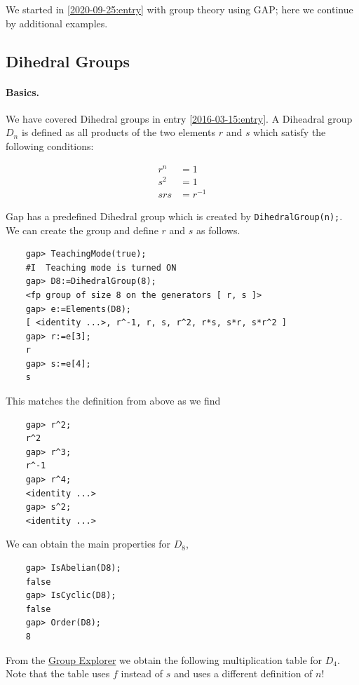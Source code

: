 
We started in \ref{2020-09-25:entry} with group theory using GAP; here we continue by additional examples.

\subsection{Dihedral Groups}

\paragraph{Basics.} We have covered Dihedral groups in entry \ref{2016-03-15:entry}. A Diheadral group $D_n$ is defined as all products of the two elements $r$ and $s$ which satisfy the following conditions:

\begin{align*}
r^n &= 1 \\
s^2 &= 1 \\
srs &= r^{-1}
\end{align*}

Gap has a predefined Dihedral group which is created by \verb+DihedralGroup(n);+. We can create the group and define $r$ and $s$ as follows.

\begin{verbatim}
    gap> TeachingMode(true);
    #I  Teaching mode is turned ON
    gap> D8:=DihedralGroup(8);
    <fp group of size 8 on the generators [ r, s ]>
    gap> e:=Elements(D8);
    [ <identity ...>, r^-1, r, s, r^2, r*s, s*r, s*r^2 ]
    gap> r:=e[3];
    r
    gap> s:=e[4];
    s
\end{verbatim}

This matches the definition from above as we find

\begin{verbatim}
    gap> r^2;
    r^2
    gap> r^3;
    r^-1
    gap> r^4;
    <identity ...>
    gap> s^2;
    <identity ...>
\end{verbatim}

We can obtain the main properties for $D_8$,

\begin{verbatim}
    gap> IsAbelian(D8);
    false
    gap> IsCyclic(D8);
    false
    gap> Order(D8);
    8
\end{verbatim}

From the \href{https://nathancarter.github.io/group-explorer/Multtable.html?groupURL=https://nathancarter.github.io/group-explorer/groups/D_4.group}{Group Explorer} we obtain the following multiplication table for $D_4$. Note that the table uses $f$ instead of $s$ and uses a different definition of $n$!


